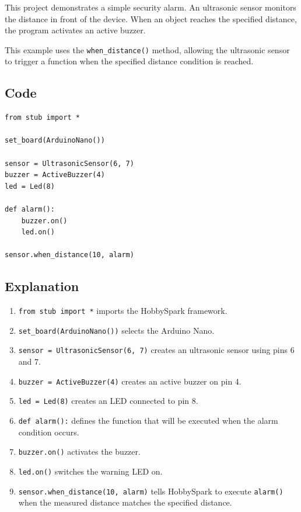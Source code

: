 This project demonstrates a simple security alarm. An ultrasonic sensor
monitors the distance in front of the device. When an object reaches the
specified distance, the program activates an active buzzer.

This example uses the \texttt{when\_distance()} method, allowing the
ultrasonic sensor to trigger a function when the specified distance
condition is reached.

\subsection{Code}

\begin{lstlisting}
from stub import *

set_board(ArduinoNano())

sensor = UltrasonicSensor(6, 7)
buzzer = ActiveBuzzer(4)
led = Led(8)

def alarm():
    buzzer.on()
    led.on()

sensor.when_distance(10, alarm)
\end{lstlisting}

\subsection{Explanation}

\begin{enumerate}
    \item \texttt{from stub import *} imports the HobbySpark framework.

    \item \texttt{set\_board(ArduinoNano())} selects the Arduino Nano.

    \item \texttt{sensor = UltrasonicSensor(6, 7)} creates an ultrasonic
    sensor using pins 6 and 7.

    \item \texttt{buzzer = ActiveBuzzer(4)} creates an active buzzer on
    pin 4.

    \item \texttt{led = Led(8)} creates an LED connected to pin 8.

    \item \texttt{def alarm():} defines the function that will be executed
    when the alarm condition occurs.

    \item \texttt{buzzer.on()} activates the buzzer.

    \item \texttt{led.on()} switches the warning LED on.

    \item \texttt{sensor.when\_distance(10, alarm)} tells HobbySpark to
    execute \texttt{alarm()} when the measured distance matches the
    specified distance.
\end{enumerate}


